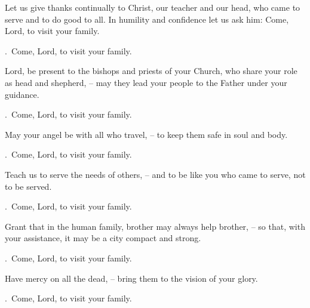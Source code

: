 \lettrine[loversize=0.15,lines=2]{L}{}et us give thanks continually to Christ, our teacher and our head, who came to serve and to do good to all. In humility and confidence let us ask him: Come, Lord, to visit your family.
\par \Rbar.~Come, Lord, to visit your family.

Lord, be present to the bishops and priests of your Church, who share your role as head and shepherd,
– may they lead your people to the Father under your guidance.
\par \Rbar.~Come, Lord, to visit your family.

May your angel be with all who travel,
– to keep them safe in soul and body.
\par \Rbar.~Come, Lord, to visit your family.

Teach us to serve the needs of others,
– and to be like you who came to serve, not to be served.
\par \Rbar.~Come, Lord, to visit your family.

Grant that in the human family, brother may always help brother,
– so that, with your assistance, it may be a city compact and strong.
\par \Rbar.~Come, Lord, to visit your family.

Have mercy on all the dead,
– bring them to the vision of your glory.
\par \Rbar.~Come, Lord, to visit your family.

